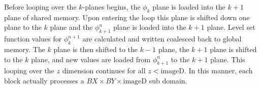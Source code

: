Before looping over the $k$-planes begins, the $\phi_k$ plane is loaded into the $k+1$ plane of shared memory. Upon entering the loop this plane is shifted down one plane to the $k$ plane and the $\phi_{k+1}^n$ plane is loaded into the $k+1$ plane. Level set function values for $\phi_{k}^{n+1}$ are calculated and written coalesced back to global memory. The $k$ plane is then shifted to the $k-1$ plane, the $k+1$ plane is shifted to the $k$ plane, and new values are loaded from $\phi_{k+1}^n$ to the $k+1$ plane. This looping over the $z$ dimension continues for all $z<\textrm{imageD}$. In this manner, each block actually processes a $BX \times BY \times \textrm{imageD}$ sub domain.

